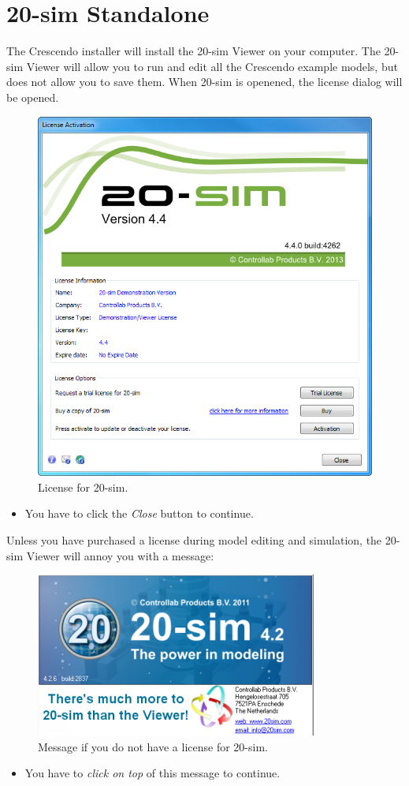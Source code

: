 \documentclass{crescendorepchap}
\begin{document}
\section{20-sim Standalone}

The Crescendo installer will install the 20-sim Viewer on your computer.
The 20-sim Viewer will allow you to run and edit all the Crescendo example
models, but does not allow you to save them. When 20-sim is openened,
the license dialog will be opened.

\begin{figure}[htbp]
\centering
\includegraphics[width=.4\textwidth]{images/20simLicense.png}
\caption{License for 20-sim.}
\end{figure}

\begin{itemize}
\item
  You have to click the \emph{Close} button to continue.
\end{itemize}

Unless you have purchased a license during model editing and
simulation, the 20-sim Viewer will annoy you with a message:

\begin{figure}[htbp]
\centering
\includegraphics[width=.6\textwidth]{images/20simViewer.png}
\caption{Message if you do not have a license for 20-sim.}
\end{figure}

\begin{itemize}
\item
  You have to \emph{click on top} of this message to continue.
\end{itemize}
\end{document}
